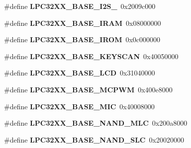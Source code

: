 \begin{DoxyCompactItemize}
\item 
\mbox{\label{group__lpc32xx__reg_gafdf8accbce5b283c01bfbfd53e896793}} 
\#define {\bfseries L\+P\+C32\+X\+X\+\_\+\+B\+A\+S\+E\+\_\+\+I2\+S\+\_}~0x2009c000
\item 
\mbox{\label{group__lpc32xx__reg_gacdd2984eca4c1e0634c94e8d2b99c9aa}} 
\#define {\bfseries L\+P\+C32\+X\+X\+\_\+\+B\+A\+S\+E\+\_\+\+I\+R\+AM}~0x08000000
\item 
\mbox{\label{group__lpc32xx__reg_ga709d8fdaa0c7128258d5befc8de9f9f7}} 
\#define {\bfseries L\+P\+C32\+X\+X\+\_\+\+B\+A\+S\+E\+\_\+\+I\+R\+OM}~0x0c000000
\item 
\mbox{\label{group__lpc32xx__reg_ga39700708ad9091b80b0ff053d151c729}} 
\#define {\bfseries L\+P\+C32\+X\+X\+\_\+\+B\+A\+S\+E\+\_\+\+K\+E\+Y\+S\+C\+AN}~0x40050000
\item 
\mbox{\label{group__lpc32xx__reg_gae4df1adbb59f7730927c644dce7e6965}} 
\#define {\bfseries L\+P\+C32\+X\+X\+\_\+\+B\+A\+S\+E\+\_\+\+L\+CD}~0x31040000
\item 
\mbox{\label{group__lpc32xx__reg_ga3499d58bb531118a23a019d01946ec79}} 
\#define {\bfseries L\+P\+C32\+X\+X\+\_\+\+B\+A\+S\+E\+\_\+\+M\+C\+P\+WM}~0x400e8000
\item 
\mbox{\label{group__lpc32xx__reg_ga78adf7a11b36771848a064c0147e7e60}} 
\#define {\bfseries L\+P\+C32\+X\+X\+\_\+\+B\+A\+S\+E\+\_\+\+M\+IC}~0x40008000
\item 
\mbox{\label{group__lpc32xx__reg_ga1419fd0a60ca5629645c227e067d6fbc}} 
\#define {\bfseries L\+P\+C32\+X\+X\+\_\+\+B\+A\+S\+E\+\_\+\+N\+A\+N\+D\+\_\+\+M\+LC}~0x200a8000
\item 
\mbox{\label{group__lpc32xx__reg_gae078058237a9d0942db233031d2d55bb}} 
\#define {\bfseries L\+P\+C32\+X\+X\+\_\+\+B\+A\+S\+E\+\_\+\+N\+A\+N\+D\+\_\+\+S\+LC}~0x20020000
\item 
\mbox{\label{group__lpc32xx__reg_ga6569493d790511d7aaedd9e102329672}} 

\end{DoxyCompactItemize}
